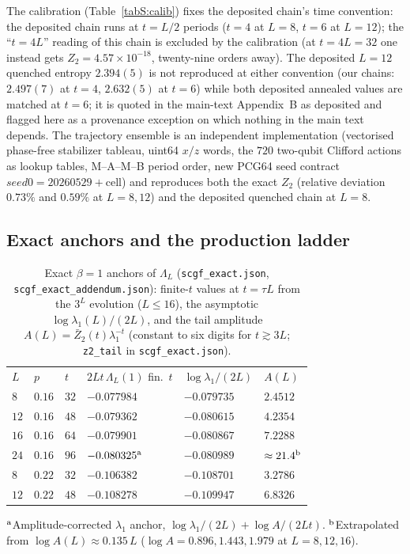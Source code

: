 \documentclass[aps,prx,reprint,superscriptaddress,nobibnotes,longbibliography]{revtex4-2}
\begin{document}
The calibration (Table~\ref{tabS:calib}) fixes the deposited chain's
time convention: the deposited chain runs at $t=L/2$ periods ($t=4$ at
$L=8$, $t=6$ at $L=12$); the ``$t=4L$'' reading of
this chain is excluded by the calibration (at $t=4L=32$ one instead gets
$Z_2=4.57\times10^{-18}$, twenty-nine orders away).  The deposited
$L=12$ quenched entropy $2.394(5)$ is not reproduced at either
convention (our chains: $2.497(7)$ at $t=4$, $2.632(5)$ at $t=6$) while
both deposited annealed values are matched at $t=6$; it is quoted in the
main-text Appendix~B as deposited and flagged here as a provenance
exception on which nothing in the main text depends.  The trajectory
ensemble is an independent implementation (vectorised phase-free
stabilizer tableau, uint64 $x/z$ words, the $720$ two-qubit Clifford
actions as lookup tables, M--A--M--B period order, new PCG64 seed
contract $\mathit{seed0}=20260529+\text{cell}$) and reproduces both the
exact $Z_2$ (relative deviation $0.73\%$ and $0.59\%$ at $L=8,12$) and
the deposited quenched chain at $L=8$.

\subsection{Exact anchors and the production ladder}

\begin{table}[t]
\caption{Exact $\beta=1$ anchors of $\Lambda_L$
(\texttt{scgf\_exact.json}, \texttt{scgf\_exact\_addendum.json}):
finite-$t$ values at $t=\tau L$ from the $3^L$ evolution ($L\le16$), the
asymptotic $\log\lambda_1(L)/(2L)$, and the tail amplitude
$A(L)=\bar Z_2(t)\lambda_1^{-t}$ (constant to six digits for
$t\gtrsim3L$; \texttt{z2\_tail} in \texttt{scgf\_exact.json}).}
\label{tabS:anchors}
\begin{ruledtabular}
\begin{tabular}{llllll}
$L$ & $p$ & $t$ & $2Lt\,\Lambda_L(1)$ fin.\ $t$ & $\log\lambda_1/(2L)$ &
$A(L)$\\
\colrule
$8$ & $0.16$ & $32$ & $-0.077984$ & $-0.079735$ & $2.4512$\\
$12$ & $0.16$ & $48$ & $-0.079362$ & $-0.080615$ & $4.2354$\\
$16$ & $0.16$ & $64$ & $-0.079901$ & $-0.080867$ & $7.2288$\\
$24$ & $0.16$ & $96$ & $-0.080325^{\rm a}$ & $-0.080989$ &
$\approx21.4^{\rm b}$\\
$8$ & $0.22$ & $32$ & $-0.106382$ & $-0.108701$ & $3.2786$\\
$12$ & $0.22$ & $48$ & $-0.108278$ & $-0.109947$ & $6.8326$\\
\end{tabular}
\end{ruledtabular}
$^{\rm a}$Amplitude-corrected $\lambda_1$ anchor,
$\log\lambda_1/(2L)+\log A/(2Lt)$.  $^{\rm b}$Extrapolated from
$\log A(L)\approx0.135\,L$ ($\log A=0.896,1.443,1.979$ at $L=8,12,16$).
\end{table}
\end{document}
